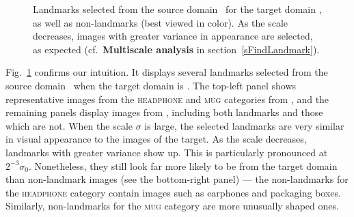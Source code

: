 \begin{figure}[t]
\begin{tabular}{c|c|c}
   \end{tabular}
    \caption{Landmarks selected from the source domain \amazon\ for the target domain \webcam, as well as non-landmarks (best viewed in color). As the scale decreases, images with greater variance in appearance are selected, as expected (cf.\ {\bf Multiscale analysis} in section~\ref{sFindLandmark}).}\label{fLandmark}
   \end{figure}




Fig.~\ref{fLandmark} confirms our intuition. It displays several landmarks selected from the source domain \amazon\ when the target domain is \webcam. The top-left panel shows representative images from the \textsc{headphone} and \textsc{mug} categories from {\webcam}, and the remaining panels display images from \amazon, including both landmarks and those which are not. When the scale $\sigma$ is large, the selected landmarks are very similar in visual appearance to the images of the target. As the scale decreases, landmarks with greater variance show up. This is particularly pronounced at $2^{-3}\sigma_0$. Nonetheless, they still look far more likely to be from the target {\webcam} domain than non-landmark images (see the bottom-right panel) --- the non-landmarks for the \textsc{headphone} category contain images such as earphones and packaging boxes. Similarly, non-landmarks for the \textsc{mug} category are more unusually shaped ones.




